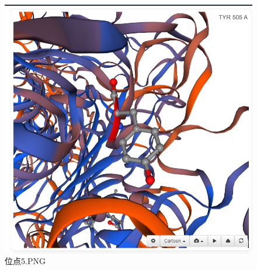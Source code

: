 \documentclass[supercite]{HustGraduPaper}
\begin{document}
		\begin{figure}[H]
			\centering
			\includegraphics[width=1\textwidth]{./material/practice4/ACE2_5.png}
			\caption{位点5.PNG}
		\end{figure}
\end{document}
